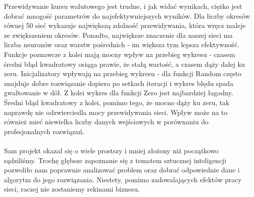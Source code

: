 \documentclass[a4paper]{article}
\begin{document}
		\vspace{0.5cm}
		Przewidywanie kursu walutowego jest trudne, i jak widać wynikach, ciężko jest dobrać mnogość parametrów do najefektywniejszych wyników. Dla liczby okresów równej 50 sieć wykazuje największą zdolność przewidywania, która wręcz maleje ze zwiększeniem okresów. Ponadto, największe znaczenie dla naszej sieci ma liczba neuronów oraz warstw pośrednich - im większa tym lepsza efektywność. Funkcje poznawcze z kolei mają mocny wpływ na przebieg wykresu - czasem średni błąd kwadratowy osiąga prawie, że stałą wartość, a czasem dąży dalej ku zeru. Inicjalizatory wpływają na przebieg wykresu - dla funkcji Random często znajduje dobre rozwiązanie dopiero po setkach iteracji i wykres błędu spada gwałtowanie w dół. Z kolei wykres dla funkcji Zero jest najbardziej łagodny. Średni błąd kwadratowy z kolei, pomimo tego, że mocno dąży ku zeru, tak naprawdę nie odzwierciedla mocy przewidywania sieci. Wpływ może na to również mieć niewielka liczby danych wejściowych w porównaniu do profesjonalnych rozwiązań.\\\\\indent
		Sam projekt okazał się o wiele prostszy i mniej złożony niż początkowo sądziliśmy. Trochę głębsze zapoznanie się z tematem sztucznej inteligencji pozwoliło nam poprawnie analizować problem oraz dobrać odpowiednie dane i algorytm do jego rozwiązania. Niestety, pomimo zadowalających efektów pracy sieci, raczej nie zostaniemy rekinami biznesu.
\end{document}
